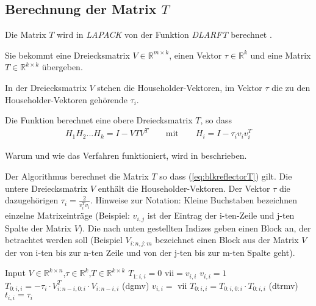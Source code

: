 \subsection{Berechnung der Matrix $T$} \label{calcT}
Die Matrix $T$ wird in \textit{LAPACK} von der Funktion \textit{DLARFT} berechnet \cite{LARFT}.

Sie bekommt eine Dreiecksmatrix $V \in \mathbb{R}^{m \times k}$, einen Vektor $\tau \in \mathbb{R}^k$ und eine Matrix $T\in \mathbb{R}^{k\times k}$ übergeben. 

In der Dreiecksmatrix $V$ stehen die Householder-Vektoren,
im Vektor $\tau$ die zu den Householder-Vektoren gehörende $\tau_i$.

Die Funktion berechnet eine obere Dreiecksmatrix $T$, so dass
\begin{align}
H_1H_2...H_k = I - VTV^T \qquad \text{mit}\qquad H_i = I - \tau_i v_iv_i^T
\label{eq:blkreflectorT}
\end{align}

Warum und wie das Verfahren funktioniert, wird in \cite{Joffrain:2006:AHT:1141885.1141886} beschrieben.



\begin{algorithm}[H]
\caption{Der Algorithmus berechnet die Matrix $T$ so dass  (\ref{eq:blkreflectorT}) gilt. Die untere Dreiecksmatrix $V$  enthält die Householder-Vektoren. Der Vektor $\tau$ die dazugehörigen $\tau_i = \frac{2}{v_i^Tv_i}$. Hinweise zur Notation: Kleine Buchstaben bezeichnen einzelne Matrixeinträge (Beispiel: $v_{i,j}$ ist der Eintrag der i-ten-Zeile und j-ten Spalte der Matrix $V$). Die nach unten gestellten Indizes geben einen Block an, der betrachtet werden soll (Beispiel $V_{i:n,j:m}$ bezeichnet einen Block aus der Matrix $V$ der von i-ten bis zur n-ten Zeile und von der j-ten bis zur m-ten Spalte geht).}
\label{alg:clacT}
\begin{algorithmic}[1]
\State Input $V \in \mathbb{R}^{k \times n}$,$\tau \in \mathbb{R}^k$,$T \in \mathbb{R}^{k \times k}$
		\State $T_{1:i,i}=0$
	\Else
		\State vii$ = v_{i,i}$
		\State $v_{i,i} = 1 $
		\State $T_{0:i,i} = - \tau_i \cdot V_{i:n-i,0:i}^T \cdot V_{i:n-i,i}$ (dgmv)
		\State $ v_{i,i} =$ vii 
		\State $T_{0:i,i} = T_{0:i,0:i} \cdot T_{0:i,i}$ (dtrmv)
		\State $t_{i,i} = \tau_i$
	\EndIf
\EndFor
\end{algorithmic}
\end{algorithm}

